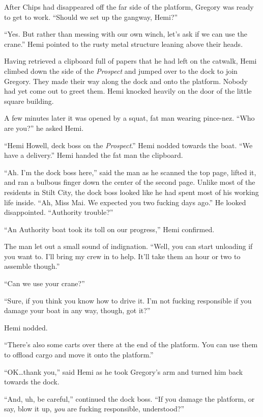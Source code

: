 \documentclass[
]{scrbook}
\begin{document}
After Chips had disappeared off the far side of the platform, Gregory
was ready to get to work. ``Should we set up the gangway, Hemi?''

``Yes. But rather than messing with our own winch, let's ask if we can
use the crane.'' Hemi pointed to the rusty metal structure leaning above
their heads.

Having retrieved a clipboard full of papers that he had left on the
catwalk, Hemi climbed down the side of the \emph{Prospect} and jumped
over to the dock to join Gregory. They made their way along the dock and
onto the platform. Nobody had yet come out to greet them. Hemi knocked
heavily on the door of the little square building.

A few minutes later it was opened by a squat, fat man wearing pince-nez.
``Who are you?'' he asked Hemi.

``Hemi Howell, deck boss on the \emph{Prospect}.'' Hemi nodded towards
the boat. ``We have a delivery.'' Hemi handed the fat man the clipboard.

``Ah. I'm the dock boss here,'' said the man as he scanned the top page,
lifted it, and ran a bulbous finger down the center of the second page.
Unlike most of the residents in Stilt City, the dock boss looked like he
had spent most of his working life inside. ``Ah, Miss Mai. We expected
you two fucking days ago.'' He looked disappointed. ``Authority
trouble?''

``An Authority boat took its toll on our progress,'' Hemi confirmed.

The man let out a small sound of indignation. ``Well, you can start
unloading if you want to. I'll bring my crew in to help. It'll take them
an hour or two to assemble though.''

``Can we use your crane?''

``Sure, if you think you know how to drive it. I'm not fucking
responsible if you damage your boat in any way, though, got it?''

Hemi nodded.

``There's also some carts over there at the end of the platform. You can
use them to offload cargo and move it onto the platform.''

``OK\ldots thank you,'' said Hemi as he took Gregory's arm and turned
him back towards the dock.

``And, uh, be careful,'' continued the dock boss. ``If you damage the
platform, or say, blow it up, \emph{you} are fucking responsible,
understood?''
\end{document}

